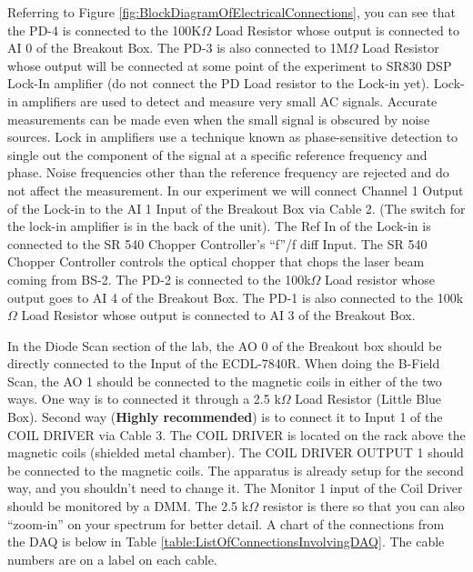 \documentclass{../lab}
\begin{document}
Referring to Figure \ref{fig:BlockDiagramOfElectricalConnections}, you can see that the PD-4 is connected to the 100K$\Omega$ Load Resistor whose output is connected to AI 0 of the Breakout Box. The PD-3 is also connected to 1M$\Omega$ Load Resistor whose output will be connected at some point of the experiment to SR830 DSP Lock-In amplifier (do not connect the PD Load resistor to the Lock-in yet). Lock-in amplifiers are used to detect and measure very small AC signals. Accurate measurements can be made even when the small signal is obscured by noise sources. Lock in amplifiers use a technique known as phase-sensitive detection to single out the component of the signal at a specific reference frequency and phase. Noise frequencies other than the reference frequency are rejected and do not affect the measurement. In our experiment we will connect Channel 1 Output of the Lock-in to the AI 1 Input of the Breakout Box via Cable 2. (The switch for the lock-in amplifier is in the back of the unit). The Ref In of the Lock-in is connected to the SR 540 Chopper Controller's ``f''/f diff Input. The SR 540 Chopper Controller controls the optical chopper that chops the laser beam coming from BS-2. The PD-2 is connected to the 100k$\Omega$ Load resistor whose output goes to AI 4 of the Breakout Box. The PD-1 is also connected to the 100k$\Omega$ Load Resistor whose output is connected to AI 3 of the Breakout Box.

In the Diode Scan section of the lab, the AO 0 of the Breakout box should be directly connected to the Input of the ECDL-7840R. When doing the B-Field Scan, the AO 1 should be connected to the magnetic coils in either of the two ways. One way is to connected it through a 2.5 k$\Omega$ Load Resistor (Little Blue Box). Second way (\textbf{Highly recommended}) is to connect it to Input 1 of the COIL DRIVER via Cable 3. The COIL DRIVER is located on the rack above the magnetic coils (shielded metal chamber). The COIL DRIVER OUTPUT 1 should be connected to the magnetic coils. The apparatus is already setup for the second way, and you shouldn't need to change it. The Monitor 1 input of the Coil Driver should be monitored by a DMM. The 2.5 k$\Omega$ resistor is there so that you can also ``zoom-in'' on your spectrum for better detail. A chart of the connections from the DAQ is below in Table \ref{table:ListOfConnectionsInvolvingDAQ}. The cable numbers are on a label on each cable.
\end{document}

